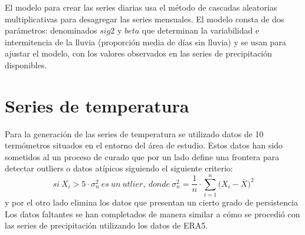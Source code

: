 


El modelo para crear las series diarias usa el método de cascadas aleatorias multiplicativas \cite{Molnar} para 
desagregar las series mensuales. El modelo consta de dos parámetros: denominados $sig2$ y $beta$
que determinan la variabilidad e intermitencia de la lluvia (proporción media de días sin lluvia) y se usan para 
ajustar el modelo, con los valores observados en las series de precipitación disponibles.












\section{Series de temperatura}
\label{tempint}
Para la generación de las series de temperatura se utilizado datos de 10 termómetros situados en el entorno del área de estudio.
Estos datos han sido sometidos al un proceso de curado que por un lado define una frontera para detectar outliers o datos atípicos
siguiendo el siguiente criterio:
\begin{equation}
  si~X_i>5\cdot\sigma^2_n~es~un~utlier,~donde~\sigma^2_n=\frac{1}{n}\cdot\sum^n_{i=1}\bigg(X_i-\bar{X}\bigg)^2
\end{equation}
y por el otro lado elimina los datos que presentan un cierto grado de persistencia \cite{Estevez}
Los datos faltantes se han completados de manera similar a cómo se procedió con las series 
de precipitación utilizando los datos de ERA5.


